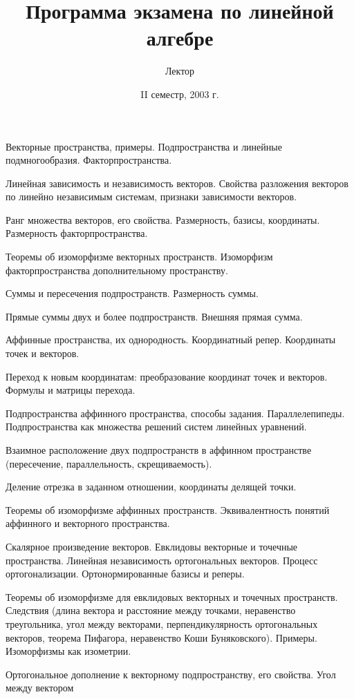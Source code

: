 \documentclass[a4paper]{article}
\title{Программа экзамена по линейной алгебре}
\author{Лектор \framebox{Е.\,Г.\,Скляренко}}
\date{II семестр, 2003 г.}
\begin{document}
\maketitle

\begin{nums}{-2}
\item Векторные пространства, примеры. Подпространства
 и линейные подмногообразия. Факторпространства.
\item Линейная зависимость и независимость векторов. Свойства
разложения векторов по линейно независимым системам, признаки зависимости векторов.
\item Ранг множества векторов, его свойства. Размерность, базисы, координаты.
Размерность факторпространства.
\item Теоремы об изоморфизме векторных пространств. Изоморфизм
факторпространства дополнительному пространству.
\item Суммы и пересечения подпространств. Размерность суммы.
\item Прямые суммы двух и более подпространств. Внешняя прямая сумма.
\item Аффинные пространства, их однородность. Координатный репер.
 Координаты точек и векторов.
\item Переход к новым координатам: преобразование координат точек и векторов.
Формулы и матрицы перехода.
\item Подпространства аффинного пространства, способы задания. Параллелепипеды.
Подпространства как множества решений систем линейных уравнений.
\item Взаимное расположение двух подпространств в аффинном пространстве (пересечение,
параллельность, скрещиваемость).
\item Деление отрезка в заданном отношении, координаты делящей точки.
\item Теоремы об изоморфизме аффинных пространств. Эквивалентность понятий аффинного
и векторного пространства.
\item Скалярное произведение векторов. Евклидовы векторные и точечные пространства.
Линейная независимость ортогональных векторов. Процесс ортогонализации. Ортонормированные базисы и реперы.
\item Теоремы об изоморфизме для евклидовых векторных и точечных пространств.
Следствия (длина вектора и расстояние между точками, неравенство треугольника, угол между
векторами, перпендикулярность ортогональных векторов, теорема Пифагора, неравенство Коши
Буняковского). Примеры. Изоморфизмы как изометрии.
\item Ортогональное дополнение к векторному подпространству, его свойства. Угол между вектором

\end{nums}
\end{document}
